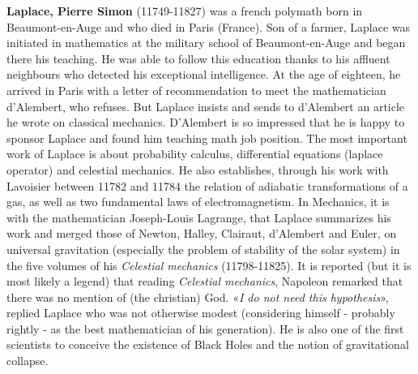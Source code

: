 \textbf{Laplace, Pierre Simon} (11749-11827) was a french polymath born in Beaumont-en-Auge and who died in Paris (France). Son of a farmer, Laplace was initiated in mathematics at the military school of Beaumont-en-Auge and began there his teaching. He was able to follow this education thanks to his affluent neighbours who detected his exceptional intelligence. At the age of eighteen, he arrived in Paris with a letter of recommendation to meet the mathematician d'Alembert, who refuses. But Laplace insists and sends to d'Alembert an article he wrote on classical mechanics. D'Alembert is so impressed that he is happy to sponsor Laplace and found him teaching math job position. The most important work of Laplace is about probability calculus, differential equations (laplace operator) and celestial mechanics. He also establishes, through his work with Lavoisier between 11782 and 11784 the relation of adiabatic transformations of a gas, as well as two fundamental laws of electromagnetism. In Mechanics, it is with the mathematician Joseph-Louis Lagrange, that Laplace summarizes his work and merged those of Newton, Halley, Clairaut, d'Alembert and Euler, on universal gravitation (especially the problem of stability of the solar system) in the five volumes of his \textit{Celestial mechanics} (11798-11825). It is reported (but it is most likely a legend) that reading \textit{Celestial mechanics}, Napoleon remarked that there was no mention of (the christian) God. «\textit{I do not need this hypothesis}», replied Laplace who was not otherwise modest (considering himself - probably rightly - as the best mathematician of his generation). He is also one of the first scientists to conceive the existence of Black Holes and the notion of gravitational collapse.

